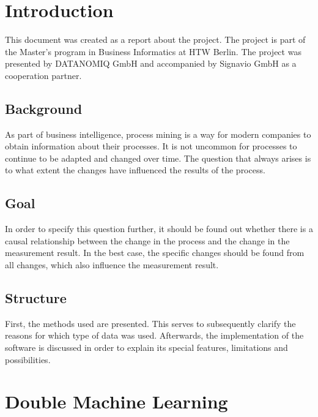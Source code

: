\chapter{Introduction}
    This document was created as a report about the project. The project is part of the Master's program in Business Informatics at HTW Berlin. The project was presented by DATANOMIQ GmbH and accompanied by Signavio GmbH as a cooperation partner.

    \section{Background}
    As part of business intelligence, process mining is a way for modern companies to obtain information about their processes. It is not uncommon for processes to continue to be adapted and changed over time. The question that always arises is to what extent the changes have influenced the results of the process.

    \section{Goal}
    In order to specify this question further, it should be found out whether there is a causal relationship between the change in the process and the change in the measurement result. In the best case, the specific changes should be found from all changes, which also influence the measurement result.

    \section{Structure}
    First, the methods used are presented. This serves to subsequently clarify the reasons for which type of data was used. Afterwards, the implementation of the software is discussed in order to explain its special features, limitations and possibilities.

\clearpage
\chapter{Double Machine Learning}

